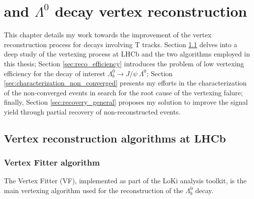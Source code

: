 \chapter{\texorpdfstring{\lbz}{Lambdab} and \texorpdfstring{$\Lambda^0$}{Lambda} decay vertex reconstruction}
\label{cap:vertex_reconstruction}
This chapter details my work towards the improvement of the vertex reconstruction process for decays involving T tracks.
Section \ref{sec:reco_algorithms} delves into a deep study of the vertexing process at LHCb and the two algorithms employed in this thesis;
Section \ref{sec:reco_efficiency} introduces the problem of low vertexing efficiency for the decay of interest $\Lambda_b^0 \rightarrow J/\psi~\Lambda^0$;
Section \ref{sec:characterization_non_converged} presents my efforts in the characterization of the non-converged events in search for the root cause of the vertexing falure;
finally, Section \ref{sec:recovery_general} proposes my solution to improve the signal yield through partial recovery of non-reconstructed events.

\section{Vertex reconstruction algorithms at LHCb}
\label{sec:reco_algorithms}

\subsection{Vertex Fitter algorithm}
The Vertex Fitter (VF), implemented as part of the LoKi analysis toolkit, is the main vertexing algorithm used for the reconstruction of the $\Lambda_b^0$ decay.

